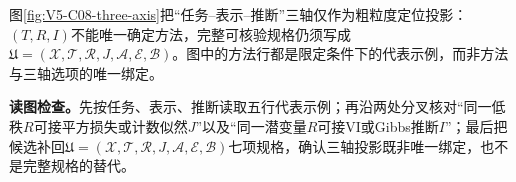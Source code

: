 \documentclass[UTF8,a4paper,11pt,openany]{ctexbook}
\begin{document}
\setcounter{page}{734}
\setcounter{chapter}{37}
\setcounter{section}{1}
\setcounter{figure}{2}
\pagestyle{headings}
图\ref{fig:V5-C08-three-axis}把“任务--表示--推断”三轴仅作为粗粒度定位投影：$(T,R,I)$不能唯一确定方法，完整可核验规格仍须写成$\mathfrak U=(\mathcal X,\mathcal T,\mathcal R,J,\mathcal A,\mathcal E,\mathcal B)$。图中的方法行都是限定条件下的代表示例，而非方法与三轴选项的唯一绑定。

\FloatBarrier
\noindent\textbf{读图检查。}先按任务、表示、推断读取五行代表示例；再沿两处分叉核对“同一低秩$R$可接平方损失或计数似然$J$”以及“同一潜变量$R$可接VI或Gibbs推断$I$”；最后把候选补回$\mathfrak U=(\mathcal X,\mathcal T,\mathcal R,J,\mathcal A,\mathcal E,\mathcal B)$七项规格，确认三轴投影既非唯一绑定，也不是完整规格的替代。
\end{document}
